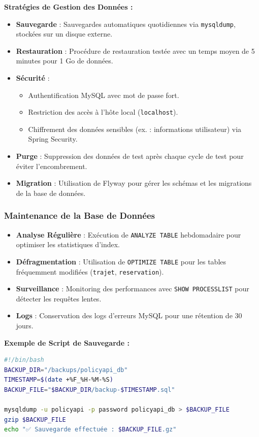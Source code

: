 \documentclass[12pt,a4paper]{article}
\begin{document}
\begin{policybox}
\textbf{Stratégies de Gestion des Données :}

\begin{itemize}
\item \textbf{Sauvegarde} : Sauvegardes automatiques quotidiennes via \texttt{mysqldump}, stockées sur un disque externe.
\item \textbf{Restauration} : Procédure de restauration testée avec un temps moyen de 5 minutes pour 1 Go de données.
\item \textbf{Sécurité} :
\begin{itemize}
\item Authentification MySQL avec mot de passe fort.
\item Restriction des accès à l'hôte local (\texttt{localhost}).
\item Chiffrement des données sensibles (ex. : informations utilisateur) via Spring Security.
\end{itemize}
\item \textbf{Purge} : Suppression des données de test après chaque cycle de test pour éviter l'encombrement.
\item \textbf{Migration} : Utilisation de Flyway pour gérer les schémas et les migrations de la base de données.
\end{itemize}
\end{policybox}


\subsubsection{Maintenance de la Base de Données}

\begin{itemize}
\item \textbf{Analyse Régulière} : Exécution de \texttt{ANALYZE TABLE} hebdomadaire pour optimiser les statistiques d'index.
\item \textbf{Défragmentation} : Utilisation de \texttt{OPTIMIZE TABLE} pour les tables fréquemment modifiées (\texttt{trajet}, \texttt{reservation}).
\item \textbf{Surveillance} : Monitoring des performances avec \texttt{SHOW PROCESSLIST} pour détecter les requêtes lentes.
\item \textbf{Logs} : Conservation des logs d'erreurs MySQL pour une rétention de 30 jours.
\end{itemize}

\begin{codebox}
\textbf{Exemple de Script de Sauvegarde :}
\begin{lstlisting}[language=bash]
#!/bin/bash
BACKUP_DIR="/backups/policyapi_db"
TIMESTAMP=$(date +%F_%H-%M-%S)
BACKUP_FILE="$BACKUP_DIR/backup-$TIMESTAMP.sql"

mysqldump -u policyapi -p password policyapi_db > $BACKUP_FILE
gzip $BACKUP_FILE
echo "✅ Sauvegarde effectuée : $BACKUP_FILE.gz"
\end{lstlisting}
\end{codebox}
\end{document}
